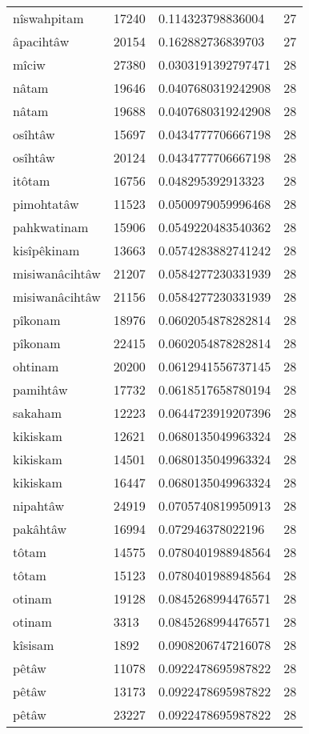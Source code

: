 \begin{longtable}{llll}
nîswahpitam & 17240 & 0.114323798836004 & 27 \\
âpacihtâw & 20154 & 0.162882736839703 & 27 \\
mîciw & 27380 & 0.0303191392797471 & 28 \\
nâtam & 19646 & 0.0407680319242908 & 28 \\
nâtam & 19688 & 0.0407680319242908 & 28 \\
osîhtâw & 15697 & 0.0434777706667198 & 28 \\
osîhtâw & 20124 & 0.0434777706667198 & 28 \\
itôtam & 16756 & 0.048295392913323 & 28 \\
pimohtatâw & 11523 & 0.0500979059996468 & 28 \\
pahkwatinam & 15906 & 0.0549220483540362 & 28 \\
kisîpêkinam & 13663 & 0.0574283882741242 & 28 \\
misiwanâcihtâw & 21207 & 0.0584277230331939 & 28 \\
misiwanâcihtâw & 21156 & 0.0584277230331939 & 28 \\
pîkonam & 18976 & 0.0602054878282814 & 28 \\
pîkonam & 22415 & 0.0602054878282814 & 28 \\
ohtinam & 20200 & 0.0612941556737145 & 28 \\
pamihtâw & 17732 & 0.0618517658780194 & 28 \\
sakaham & 12223 & 0.0644723919207396 & 28 \\
kikiskam & 12621 & 0.0680135049963324 & 28 \\
kikiskam & 14501 & 0.0680135049963324 & 28 \\
kikiskam & 16447 & 0.0680135049963324 & 28 \\
nipahtâw & 24919 & 0.0705740819950913 & 28 \\
pakâhtâw & 16994 & 0.072946378022196 & 28 \\
tôtam & 14575 & 0.0780401988948564 & 28 \\
tôtam & 15123 & 0.0780401988948564 & 28 \\
otinam & 19128 & 0.0845268994476571 & 28 \\
otinam & 3313 & 0.0845268994476571 & 28 \\
kîsisam & 1892 & 0.0908206747216078 & 28 \\
pêtâw & 11078 & 0.0922478695987822 & 28 \\
pêtâw & 13173 & 0.0922478695987822 & 28 \\
pêtâw & 23227 & 0.0922478695987822 & 28 \\

\end{longtable}
